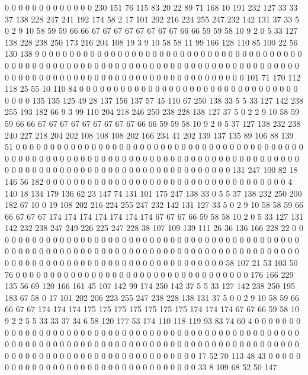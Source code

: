 0 0 0 0 0 0 0 0 0 0 0 0 0 230 151 76 115 83 20 22
89 71 168 10 191 232 127 33 33 37 138 228 247 241 192 174 58 2 17 101
202 216 224 255 247 232 142 131 37 33 5 0 2 9 10 58 59 59 66 66
67 67 67 67 67 67 67 67 66 66 59 59 58 10 9 2 0 5 33 127
138 228 238 250 173 216 204 108 19 3 9 10 58 58 11 99 166 128 110 85
100 22 56 130 138 9 0 0 0 0 0 0 0 0 0 0 0 0 0 0
0 0 0 0 0 0 0 0 0 0 0 0 0 0 0 0 0 0 0 0
0 0 0 0 0 0 0 0 0 0 0 0 0 0 0 0 0 0 0 0
0 0 0 0 0 0 0 0 0 0 0 0 0 0 0 0 0 0 0 0
0 0 0 0 0 0 0 0 0 0 0 0 0 0 0 0 0 0 0 0
0 0 0 0 0 0 0 0 0 0 0 0 0 0 0 0 0 0 0 0
0 0 101 71 170 112 118 25 55 10 110 84 0 0 0 0 0 0 0 0
0 0 0 0 0 0 0 0 0 0 0 0 0 0 0 0 0 0 0 0
0 0 0 0 0 0 0 0 135 135 125 49 28 137 156 137 57 45 110 67
250 138 33 5 5 33 127 142 238 255 193 182 66 9 3 99 110 204 218 246
250 238 228 138 127 37 5 0 2 2 9 10 58 59 59 66 66 67 67 67
67 67 67 67 67 67 66 66 59 59 58 10 9 2 0 5 37 127 138 232
238 240 227 218 204 202 108 108 108 202 166 234 41 202 139 137 135 89 106 88
139 51 0 0 0 0 0 0 0 0 0 0 0 0 0 0 0 0 0 0
0 0 0 0 0 0 0 0 0 0 0 0 0 0 0 0 0 0 0 0
0 0 0 0 0 0 0 0 0 0 0 0 0 0 0 0 0 0 0 0
0 0 0 0 0 0 0 0 0 0 0 0 0 0 0 0 0 0 0 0
0 0 0 0 0 0 0 0 0 0 0 0 0 0 0 0 0 0 0 0
0 0 0 0 0 0 0 0 0 0 0 0 0 0 0 0 0 0 0 0
131 247 100 82 18 146 56 182 0 0 0 0 0 0 0 0 0 0 0 0
0 0 0 0 0 0 0 0 0 0 0 0 0 0 0 0 0 0 0 0
0 0 0 4 140 18 134 179 136 62 23 147 74 131 101 175 247 138 33 0
5 5 37 138 232 250 200 182 67 10 0 19 108 202 216 224 255 247 232 142
131 127 33 5 0 2 9 10 58 58 59 66 66 67 67 67 174 174 174 174
174 174 174 67 67 67 66 59 58 58 10 2 0 5 33 127 131 142 232 238
247 249 226 225 247 228 38 107 109 139 111 26 36 136 166 228 22 0 0 0
0 0 0 0 0 0 0 0 0 0 0 0 0 0 0 0 0 0 0 0
0 0 0 0 0 0 0 0 0 0 0 0 0 0 0 0 0 0 0 0
0 0 0 0 0 0 0 0 0 0 0 0 0 0 0 0 0 0 0 0
0 0 0 0 0 0 0 0 0 0 0 0 0 0 0 0 0 0 0 0
0 0 0 0 0 0 0 0 0 0 0 0 0 0 0 0 0 0 0 0
0 0 0 0 0 0 0 0 0 0 0 0 0 0 0 0 0 58 107 21
53 103 50 76 0 0 0 0 0 0 0 0 0 0 0 0 0 0 0 0
0 0 0 0 0 0 0 0 0 0 0 0 0 0 0 0 0 0 176 166
229 135 56 69 120 166 161 45 107 142 99 174 250 142 37 5 5 33 127 142
238 250 195 183 67 58 0 17 101 202 206 223 255 247 238 228 138 131 37 5
0 0 2 9 10 58 59 66 66 67 67 174 174 174 175 175 175 175 175 175
175 174 174 174 67 67 66 59 58 10 9 2 2 5 5 33 33 37 34 6
58 120 177 53 174 110 118 119 93 83 74 60 4 0 0 0 0 0 0 0
0 0 0 0 0 0 0 0 0 0 0 0 0 0 0 0 0 0 0 0
0 0 0 0 0 0 0 0 0 0 0 0 0 0 0 0 0 0 0 0
0 0 0 0 0 0 0 0 0 0 0 0 0 0 0 0 0 0 0 0
0 0 0 0 0 0 0 0 0 0 0 0 0 0 0 0 0 0 0 0
0 0 0 0 0 0 0 0 0 0 0 0 0 0 0 0 0 0 0 0
0 0 0 0 0 0 0 0 0 0 0 0 0 0 17 52 70 113 48 43
0 0 0 0 0 0 0 0 0 0 0 0 0 0 0 0 0 0 0 0
0 0 0 0 0 0 0 0 0 0 0 0 0 33 8 109 68 52 50 147
